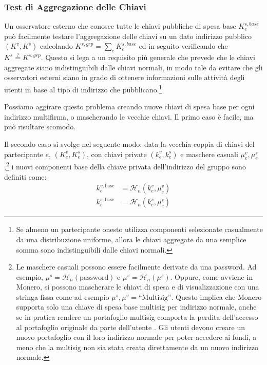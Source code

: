 \subsubsection*{Test di Aggregazione delle Chiavi}
Un osservatore esterno che conosce tutte le chiavi pubbliche di spesa base $K^{s,base}_e$ può facilmente testare l'aggregazione delle chiavi su un dato indirizzo pubblico $(K^v,K^s)$ calcolando $K^{s,grp} = \sum_e K^{s,base}_e$ ed in seguito verificando che $K^s \stackrel{?}{=} K^{s,grp}$. Questo si lega a un requisito più generale che prevede che le chiavi aggregate siano indistinguibili dalle chiavi normali, in modo tale da evitare che gli osservatori esterni siano in grado di ottenere informazioni sulle attività degli utenti in base al tipo di indirizzo che pubblicano.\footnote{Se almeno un partecipante onesto utilizza componenti selezionate casualmente da una distribuzione uniforme, allora le chiavi aggregate da una semplice somma sono indistinguibili \cite{SCOZZAFAVA1993313} dalle chiavi normali.}%

Possiamo aggirare questo problema creando nuove chiavi di spesa base per ogni indirizzo multifirma, o mascherando le vecchie chiavi. Il primo caso è facile, ma può risultare scomodo.

Il secondo caso si svolge nel seguente modo: data la vecchia coppia di chiavi del partecipante $e$, $(K^v_e, K^s_e)$, con chiavi private $(k^v_e, k^s_e)$ e maschere casuali $\mu^v_e, \mu^s_e$,\footnote{Le maschere casuali possono essere facilmente derivate da una password. Ad esempio, $\mu^s = \mathcal{H}_n(\text{password})$ e $\mu^v = \mathcal{H}_n(\mu^s)$. Oppure, come avviene in Monero, si possono mascherare le chiavi di spesa e di visualizzazione con una stringa fissa come ad esempio $\mu^s, \mu^v = \text{``Multisig''}$. Questo implica che Monero supporta solo una chiave di spesa base multisig per indirizzo normale, anche se in pratica rendere un portafoglio multisig comporta la perdita dell’accesso al portafoglio originale da parte dell’utente \cite{cli-22multisig-instructions}. Gli utenti devono creare un nuovo portafoglio con il loro indirizzo normale per poter accedere ai fondi, a meno che la multisig non sia stata creata direttamente da un nuovo indirizzo normale.} i nuovi componenti base della chiave privata dell’indirizzo del gruppo sono definiti come:
\begin{align*}
    k^{v,\text{base}}_e &= \mathcal{H}_n(k^v_e, \mu^v_e)\\
    k^{s,\text{base}}_e &= \mathcal{H}_n(k^s_e, \mu^s_e)
\end{align*}

